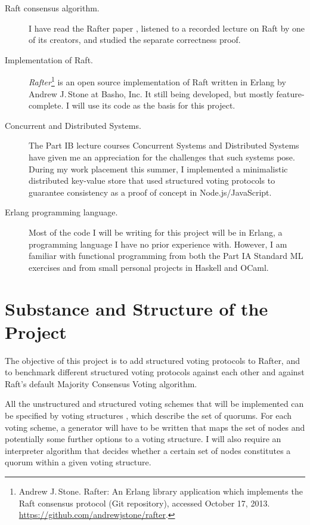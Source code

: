 \documentclass[12pt]{scrartcl}
\begin{document}
\begin{description}

\item[Raft consensus algorithm.] I have read the Rafter paper \cite{raft}, listened to a recorded lecture on Raft by one of its creators, and studied the separate correctness proof.

\item[Implementation of Raft.] \emph{Rafter}\footnote{Andrew J.\,Stone. Rafter: An Erlang library application which implements the Raft consensus protocol (Git repository), accessed October 17, 2013. \url{https://github.com/andrewjstone/rafter}.} is an open source implementation of Raft written in Erlang by Andrew J.\,Stone at Basho, Inc. It still being developed, but mostly feature-complete. I will use its code as the basis for this project.

\item[Concurrent and Distributed Systems.] The Part \textsc{IB} lecture courses Concurrent Systems and Distributed Systems have given me an appreciation for the challenges that such systems pose. During my work placement this summer, I implemented a minimalistic distributed key-value store that used structured voting protocols to guarantee consistency as a proof of concept in Node.js/JavaScript.

\item[Erlang programming language.] Most of the code I will be writing for this project will be in Erlang, a programming language I have no prior experience with. However, I am familiar with functional programming from both the Part \textsc{IA} Standard \textsc{ML} exercises and from small personal projects in Haskell and OCaml.

\end{description}


\section{Substance and Structure of the Project%
  \label{substance-and-structure-of-the-project}%
}

The objective of this project is to add structured voting protocols to Rafter, and to benchmark different structured voting protocols against each other and against Raft's default Majority Consensus Voting algorithm.

All the unstructured and structured voting schemes that will be implemented can be specified by voting structures \cite{voting}, which describe the set of quorums. For each voting scheme, a generator will have to be written that maps the set of nodes and potentially some further options to a voting structure. I will also require an interpreter algorithm that decides whether a certain set of nodes constitutes a quorum within a given voting structure.
\end{document}
